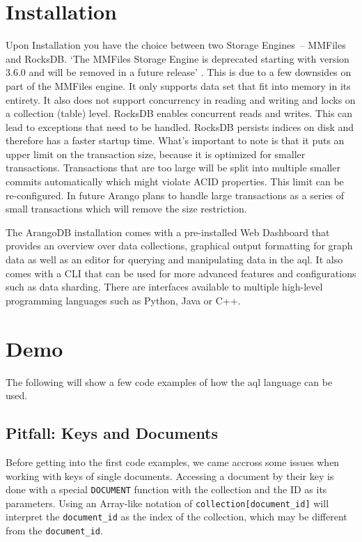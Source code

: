 \section{Installation}

Upon Installation you have the choice between two Storage Engines – MMFiles and RocksDB. `The MMFiles Storage Engine is deprecated starting with version 3.6.0 and will be removed in a future release' \parencite{ArangoDeprecated}. This is due to a few downsides on part of the MMFiles engine. It only supports data set that fit into memory in its entirety. It also does not support concurrency in reading and writing and locks on a collection (table) level. RocksDB enables concurrent reads and writes. This can lead to exceptions that need to be handled. RocksDB persists indices on disk and therefore has a faster startup time. What's important to note is that it puts an upper limit on the transaction size, because it is optimized for smaller transactions. Transactions that are too large will be split into multiple smaller commits automatically which might violate ACID properties. This limit can be re-configured. In future Arango plans to handle large transactions as a series of small transactions which will remove the size restriction. \parencite{MMvsRocks}

The ArangoDB installation comes with a pre-installed Web Dashboard that provides an overview over data collections, graphical output formatting for graph data as well as an editor for querying and manipulating data in the \gls{aql}. It also comes with a CLI that can be used for more advanced features and configurations such as data sharding. There are interfaces available to multiple high-level programming languages such as Python, Java or C++. 

\section{Demo}
The following will show a few code examples of how the \gls{aql} language can be used.

\subsection{Pitfall: Keys and Documents}
Before getting into the first code examples, we came accross some issues when working with keys of single documents. Accessing a document by their key is done with a special \texttt{DOCUMENT} function with the collection and the ID as its parameters. Using an Array-like notation of \texttt{collection[document\_id]} will interpret the \texttt{document\_id} as the index of the collection, which may be different from the \texttt{document\_id}.

